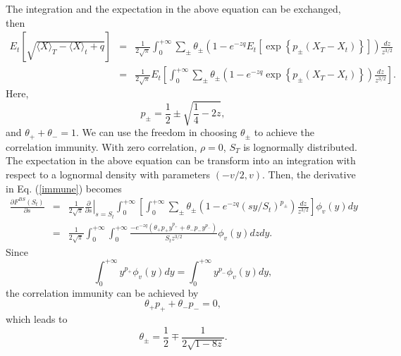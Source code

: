\documentclass[12pt]{article}
\begin{document}
      The integration and the expectation in the above equation can be exchanged, then
      \begin{eqnarray}
                          E_t\left[\sqrt{\langle X \rangle_T - \langle X \rangle_t+q}\right]
        &=&\frac{1}{2\sqrt{\pi}}\int_0^{+\infty}\sum_{\pm}\theta_{\pm}\left(1-e^{-zq}E_t\left[\exp\left\{p_{\pm}\left(X_T-X_t\right)\right\}\right]\right)\frac{dz}{z^{3/2}}\nonumber\\
        &=&\frac{1}{2\sqrt{\pi}}E_t\left[\int_0^{+\infty}\sum_{\pm}\theta_{\pm}\left(1-e^{-zq}\exp\left\{p_{\pm}\left(X_T-X_t\right)\right\}\right)\frac{dz}{z^{3/2}}\right].
      \end{eqnarray}
      Here,
      \begin{equation}
        p_{\pm}=\frac{1}{2}\pm\sqrt{\frac{1}{4}-2z},
      \end{equation}
      and $\theta_++\theta_-=1$. We can use the freedom in choosing $\theta_{\pm}$ to achieve the correlation immunity. With zero correlation, $\rho=0$,
      $S_T$ is lognormally distributed. The expectation in the above equation can be transform into an integration with respect to a lognormal density with
      parameters $(-v/2, v)$. Then, the derivative in Eq. (\ref{immune}) becomes
      \begin{eqnarray}
        \frac{\partial F^{BS}(S_t)}{\partial s} &=& \frac{1}{2\sqrt{\pi}}\left.\frac{\partial}{\partial s}\right|_{s=S_t}\int_0^{+\infty}
                    \left[\int_0^{+\infty}\sum_{\pm}\theta_{\pm}\left(1-e^{-zq}\left(sy/S_t\right)^{p_{\pm}}\right)\frac{dz}{z^{3/2}}\right]\phi_v(y)dy\nonumber\\
                    &=&\frac{1}{2\sqrt{\pi}}\int_0^{+\infty}\int_0^{+\infty}\frac{-e^{-zq}\left(\theta_+ p_+ y^{p_+}+\theta_- p_- y^{p_-}\right)}{S_tz^{3/2}}\phi_v(y)dzdy.
      \end{eqnarray}
      Since
      \begin{equation}
        \int_0^{+\infty}y^{p_+}\phi_v(y)dy = \int_0^{+\infty}y^{p_-}\phi_v(y)dy,
      \end{equation}
      the correlation immunity can be achieved by
      \begin{equation}
        \theta_+ p_+ + \theta_- p_- = 0,
      \end{equation}
      which leads to
      \begin{equation}
        \theta_{\pm}=\frac{1}{2}\mp\frac{1}{2\sqrt{1-8z}}.
      \end{equation}
\end{document}
